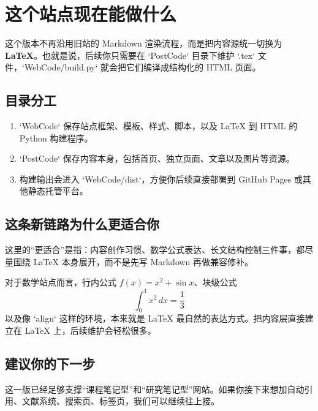 
\section{这个站点现在能做什么}

这个版本不再沿用旧站的 Markdown 渲染流程，而是把内容源统一切换为 \textbf{LaTeX}。也就是说，后续你只需要在 `PostCode` 目录下维护 `.tex` 文件，`WebCode/build.py` 就会把它们编译成结构化的 HTML 页面。

\tableofcontents

\subsection{目录分工}

\begin{enumerate}
\item `WebCode` 保存站点框架、模板、样式、脚本，以及 LaTeX 到 HTML 的 Python 构建程序。
\item `PostCode` 保存内容本身，包括首页、独立页面、文章以及图片等资源。
\item 构建输出会进入 `WebCode/dist`，方便你后续直接部署到 GitHub Pages 或其他静态托管平台。
\end{enumerate}

\subsection{这条新链路为什么更适合你}

\begin{definition}
这里的“更适合”是指：内容创作习惯、数学公式表达、长文结构控制三件事，都尽量围绕 LaTeX 本身展开，而不是先写 Markdown 再做兼容修补。
\end{definition}

对于数学站点而言，行内公式 $f(x)=x^2+\sin x$、块级公式
\[
\int_0^1 x^2\,dx = \frac{1}{3}
\]
以及像 `align` 这样的环境，本来就是 LaTeX 最自然的表达方式。把内容层直接建立在 LaTeX 上，后续维护会轻松很多。

\subsection{建议你的下一步}


\begin{remark}
这一版已经足够支撑“课程笔记型”和“研究笔记型”网站。如果你接下来想加自动引用、文献系统、搜索页、标签页，我们可以继续往上接。
\end{remark}
